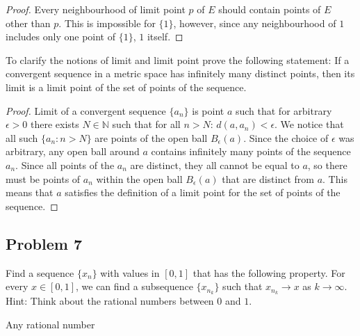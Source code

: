 \documentclass{article}
\begin{document}
\begin{proof}
Every neighbourhood of limit point $p$ of $E$ should contain points of $E$ other than $p$. This is impossible for $\{1\}$, however, since any neighbourhood of $1$ includes only one point of $\{1\}$, $1$ itself.
\end{proof}

\begin{tcolorbox}
To clarify the notions of limit and limit point prove the following statement: If a convergent sequence in a metric space has infinitely many distinct points, then its limit is a limit point of the set of points of the sequence.
\end{tcolorbox}

\begin{proof}
Limit of a convergent sequence $\{ a_n \}$ is point $a$ such that for arbitrary $\epsilon > 0$ there exists $N \in \mathbb{N}$ such that for all $n > N$: $d(a, a_n) < \epsilon$. We notice that all such $\{ a_n : n > N \}$ are points of the open ball $B_\epsilon(a)$. Since the choice of $\epsilon$ was arbitrary, any open ball around $a$ contains infinitely many points of the sequence $a_n$. Since all points of the $a_n$ are distinct, they all cannot be equal to $a$, so there must be points of $a_n$ within the open ball $B_\epsilon(a)$ that are distinct from $a$. This means that $a$ satisfies the definition of a limit point for the set of points of the sequence.

\end{proof}


\subsection*{Problem 7}

\begin{tcolorbox}
Find a sequence $\{ x_n \}$ with values in $[0, 1]$ that has the following property. For every $x \in [0, 1]$, we can find a subsequence $\{ x_{n_k} \}$ such that $x_{n_k} \to x$ as $k \to \infty$. Hint: Think about the rational numbers between $0$ and $1$.

Any rational number 
\end{tcolorbox}
\end{document}
